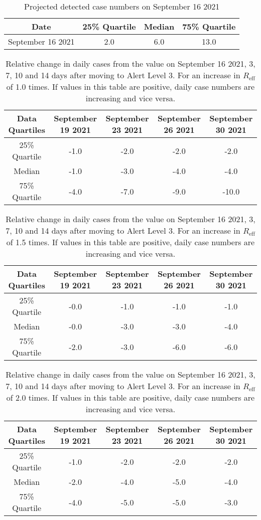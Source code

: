 
\begin{table}[h] 
 \centering 
 \begin{tabular}{c|c|c|c}
Date & 25\% Quartile & Median & 75\% Quartile \\
\hline
September 16 2021 & 2.0 & 6.0 & 13.0\\
\end{tabular}
\caption{Projected detected case numbers on September 16 2021}
\label{tab:BP_predicted_cases}
\end{table}

\begin{table}[h] 
 \centering 
 \begin{tabular}{c|c|c|c|c}
Data Quartiles & September 19 2021 & September 23 2021 & September 26 2021 & September 30 2021\\
\hline
25\% Quartile & -1.0 & -2.0 & -2.0 & -2.0\\
Median & -1.0 & -3.0 & -4.0 & -4.0\\
75\% Quartile & -4.0 & -7.0 & -9.0 & -10.0\\
\end{tabular}
\caption{Relative change in daily cases from the value on September 16 2021, 3, 7, 10 and 14 days after moving to Alert Level 3. For an increase in $R_\text{eff}$ of 1.0 times. If values in this table are positive, daily case numbers are increasing and vice versa.}
\label{tab:BP_predicted_cases_1.0}
\end{table}
\begin{table}[h] 
 \centering 
 \begin{tabular}{c|c|c|c|c}
Data Quartiles & September 19 2021 & September 23 2021 & September 26 2021 & September 30 2021\\
\hline
25\% Quartile & -0.0 & -1.0 & -1.0 & -1.0\\
Median & -0.0 & -3.0 & -3.0 & -4.0\\
75\% Quartile & -2.0 & -3.0 & -6.0 & -6.0\\
\end{tabular}
\caption{Relative change in daily cases from the value on September 16 2021, 3, 7, 10 and 14 days after moving to Alert Level 3. For an increase in $R_\text{eff}$ of 1.5 times. If values in this table are positive, daily case numbers are increasing and vice versa.}
\label{tab:BP_predicted_cases_1.5}
\end{table}
\begin{table}[h] 
 \centering 
 \begin{tabular}{c|c|c|c|c}
Data Quartiles & September 19 2021 & September 23 2021 & September 26 2021 & September 30 2021\\
\hline
25\% Quartile & -1.0 & -2.0 & -2.0 & -2.0\\
Median & -2.0 & -4.0 & -5.0 & -4.0\\
75\% Quartile & -4.0 & -5.0 & -5.0 & -3.0\\
\end{tabular}
\caption{Relative change in daily cases from the value on September 16 2021, 3, 7, 10 and 14 days after moving to Alert Level 3. For an increase in $R_\text{eff}$ of 2.0 times. If values in this table are positive, daily case numbers are increasing and vice versa.}
\label{tab:BP_predicted_cases_2.0}
\end{table}
